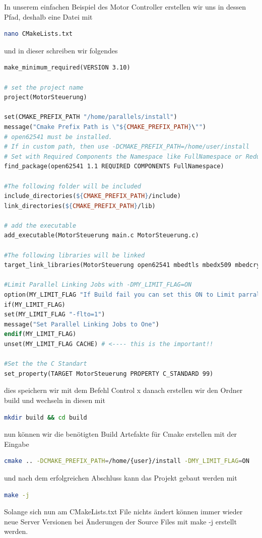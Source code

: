 In unserem einfachen Beispiel des Motor Controller erstellen wir uns in dessen Pfad, deshalb eine Datei mit
\begin{lstlisting}[language=Bash]
nano CMakeLists.txt
\end{lstlisting}
und in dieser schreiben wir folgendes
\begin{lstlisting}[language=make]
make_minimum_required(VERSION 3.10)

# set the project name
project(MotorSteuerung)

set(CMAKE_PREFIX_PATH "/home/parallels/install")
message("Cmake Prefix Path is \"${CMAKE_PREFIX_PATH}\"")
# open62541 must be installed.
# If in custom path, then use -DCMAKE_PREFIX_PATH=/home/user/install
# Set with Required Components the Namespace like FullNamespace or ReducedNamespace
find_package(open62541 1.1 REQUIRED COMPONENTS FullNamespace)

#The following folder will be included
include_directories(${CMAKE_PREFIX_PATH}/include)
link_directories(${CMAKE_PREFIX_PATH}/lib)

# add the executable
add_executable(MotorSteuerung main.c MotorSteuerung.c)

#The following libraries will be linked
target_link_libraries(MotorSteuerung open62541 mbedtls mbedx509 mbedcrypto)

#Limit Parallel Linking Jobs with -DMY_LIMIT_FLAG=ON
option(MY_LIMIT_FLAG "If Build fail you can set this ON to Limit parralel Linking Jobs to One" OFF) #OFF by default
if(MY_LIMIT_FLAG)
set(MY_LIMIT_FLAG "-flto=1")
message("Set Parallel Linking Jobs to One")
endif(MY_LIMIT_FLAG)
unset(MY_LIMIT_FLAG CACHE) # <---- this is the important!!

#Set the the C Standart
set_property(TARGET MotorSteuerung PROPERTY C_STANDARD 99)
\end{lstlisting}
dies speichern wir mit dem Befehl Control x 
danach erstellen wir den Ordner build und wechseln in diesen mit
\begin{lstlisting}[language=Bash]
mkdir build && cd build
\end{lstlisting}
nun können wir die benötigten Build Artefakte für Cmake erstellen mit der Eingabe
\begin{lstlisting}[language=Bash]
cmake .. -DCMAKE_PREFIX_PATH=/home/{user}/install -DMY_LIMIT_FLAG=ON
\end{lstlisting}
und nach dem erfolgreichen Abschluss kann das Projekt gebaut werden mit
\begin{lstlisting}[language=Bash]
make -j
\end{lstlisting}
Solange sich nun am CMakeLists.txt File nichts ändert können immer wieder neue Server Versionen bei Änderungen der Source Files mit make -j erstellt werden.

